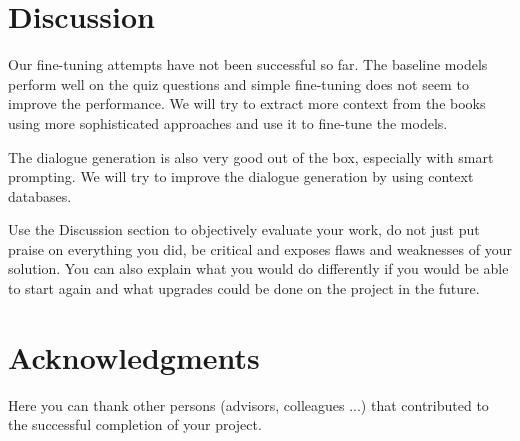 \documentclass[fleqn,moreauthors,10pt]{ds_report}
\begin{document}
\section*{Discussion}

Our fine-tuning attempts have not been successful so far.
The baseline models perform well on the quiz questions and simple fine-tuning does not seem to improve the performance.
We will try to extract more context from the books using more sophisticated approaches and use it to fine-tune the models.

The dialogue generation is also very good out of the box, especially with smart prompting.
We will try to improve the dialogue generation by using context databases.



Use the Discussion section to objectively evaluate your work, do not just put praise on everything you did, be critical and exposes flaws and weaknesses of your solution. You can also explain what you would do differently if you would be able to start again and what upgrades could be done on the project in the future.



\section*{Acknowledgments}


Here you can thank other persons (advisors, colleagues ...) that contributed to the successful completion of your project.




\end{document}
